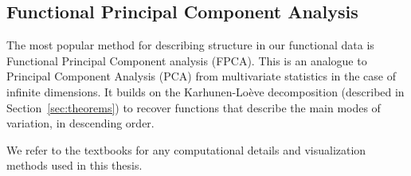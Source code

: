 \subsection{Functional Principal Component Analysis}
\label{sec:fpca}
The most popular method for describing structure in our functional data is Functional
Principal Component analysis (FPCA). This is an analogue to Principal Component Analysis
(PCA) from multivariate statistics in the case of infinite dimensions. It builds on the
Karhunen-Loève decomposition (described in Section~\ref{sec:theorems}) to
recover functions that describe the main modes of variation, in descending order.

We refer to the textbooks \textcites{RamsaySilverman2005}{KokoszkaReimherr2017} for any
computational details and visualization methods used in this thesis.
